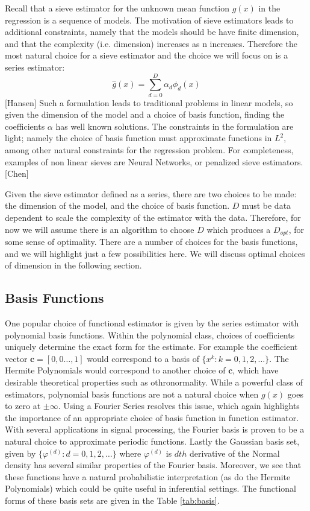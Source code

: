 \documentclass[12pt]{article}  %
\begin{document}
Recall that a sieve estimator for the unknown mean function $g(x)$ in the regression is a sequence of models. The motivation of sieve estimators leads to additional constraints, namely that the models should be have finite dimension, and that the complexity (i.e. dimension) increases as n increases.  Therefore the most natural choice for a sieve estimator and the choice we will focus on is a series estimator: 
$$ \hat{g}(x) = \sum_{d=0}^{D} \alpha_{d} \phi_{d}(x)$$  [Hansen]
Such a formulation leads to traditional problems in linear models, so given the dimension of  the model and a choice of basis function, finding the coefficients $\alpha$ has well known solutions.  The constraints in the formulation are light; namely the choice of basis function must approximate functions in $L^2$, among other natural constraints for the regression problem.  For completeness, examples of non linear sieves are Neural Networks, or penalized sieve estimators. [Chen]

Given the sieve estimator defined as a series, there are two choices to be made: the dimension of the model, and the choice of basis function.  $D$ must be data dependent to scale the complexity of the estimator with the data. Therefore, for now we will assume there is an algorithm to choose $D$ which produces a $D_{opt}$, for some sense of optimality. There are a number of choices for the basis functions, and we will highlight just a few possibilities here. We will discuss optimal choices of dimension in the following section. 

\subsection{Basis Functions}

One popular choice of functional estimator is given by the series estimator with polynomial basis functions. Within the polynomial class, choices of coefficients uniquely determine the exact form for the estimate. For example the coefficient vector $\textbf{c} = [0,0 \ldots, 1]$ would correspond to a basis of $\{x^{k}: k = 0,1,2,\ldots\}$. The Hermite Polynomials would correspond to another choice of $\textbf{c}$, which have desirable theoretical properties such as othronormality. While a powerful class of estimators, polynomial basis functions are not a natural choice when $g(x)$ goes to zero at $\pm \infty$. Using a Fourier Series resolves this issue, which again highlights the importance of an appropriate choice of basis function in function estimator. With several applications in signal processing, the Fourier basis is proven to be a natural choice to approximate periodic functions. Lastly the Gaussian basis set, given by $\{\varphi^{(d)}:d= 0,1,2,\dots\}$ where $\varphi^{(d)}$ is $dth$ derivative of the Normal density has several similar properties of the Fourier basis. Moreover, we see that these functions have a natural probabilistic interpretation (as do the Hermite Polynomials) which could be quite useful in inferential settings. The functional forms of these basis sets are given in the Table \ref{tab:basis}. 
\end{document}
